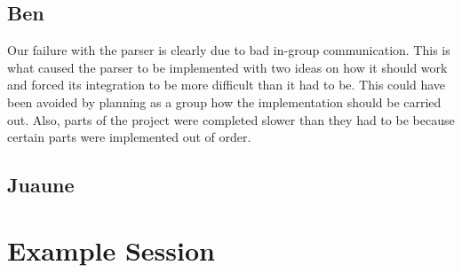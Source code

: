 \documentclass{article}
\begin{document}
\subsection{Ben}Our failure with the parser is clearly due to bad in-group communication. This is what caused the
parser to be implemented with two ideas on how it should work and forced its integration to be more difficult than
it had to be. This could have been avoided by planning as a group how the implementation should be carried out. Also,
parts of the project were completed slower than they had to be because certain parts were implemented out of order.


\subsection{Juaune}

\section{Example Session}
\end{document}

